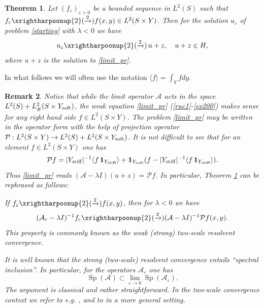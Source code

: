 \documentclass[11pt]{article}
\newcommand\e {\varepsilon}
\newcommand\stiff{{\rm stiff}}
\newcommand\soft{{\rm soft}}
\def\AA{\mathcal{A}}
\def\l{\lambda}
\DeclareMathOperator{\Sp}{Sp}
\newtheorem{theorem}{Theorem}[section]
\newtheorem{remark}[theorem]{Remark}
\theoremstyle{remark}
\begin{document}
\begin{theorem} \label{thmandrei1}
	Let $(f_\e )_{\e>0}$ be a bounded sequence in $L^2(S)$ such that $f_\e  \xrightharpoonup{2} (\xrightarrow{2})f(x,y)\in L^2(S\times Y)$.  Then for the solution $u_\e $ of problem \eqref{starting} with $\lambda<0$ we have
	$$ u_\e  \xrightharpoonup{2} (\xrightarrow{2})\,u+z , \quad u + z \in H,   $$
	where $u+z$ is the solution to \eqref{limit_pr}.
	
\end{theorem} 	

In what follows we will often use the notation $\langle f \rangle = \int_Y f dy$.


\begin{remark} \label{remandrei3}
	Notice that while the limit operator $\AA$  acts in the space $L^2(S)+L^2_\#(S\times Y_\soft)$, the weak equation \eqref{limit_pr} (\eqref{ruc1}-\eqref{ex200}) makes sense for any right hand side $f\in L^2(S\times Y)$. The problem \eqref{limit_pr} may be written in the operator form with the help of projection operator  $\mathcal{P}:L^2(S\times Y)\to L^2(S)+L^2(S\times Y_\soft)$. It is not difficult to see that for an element $f\in L^2(S\times Y)$ one has
	\begin{equation*}
		\mathcal{P}f = |Y_\stiff|^{-1} \langle f \,\mathbf{1}_{Y_\stiff}\rangle + \mathbf{1}_{Y_\soft} (f - |Y_\stiff|^{-1} \langle f\, \mathbf{1}_{Y_\stiff}\rangle).
	\end{equation*}
	Thus \eqref{limit_pr}  reads $(\AA - \l I)(u+z) = \mathcal{P} f$.
	In particular,   Theorem \ref{thmandrei1} can be rephrased as follows:
	
	\noindent If $f_\e  \xrightharpoonup{2} (\xrightarrow{2}) f(x,y)$, then for $\lambda<0$ we have
	$$ (\AA_\e-\lambda I)^{-1} f_\e  \xrightharpoonup{2} (\xrightarrow{2})(\AA-\lambda I)^{-1} \mathcal{P}f(x,y). $$
	This property is commonly known as the weak (strong) two-scale resolvent convergence.
	
	It is well known that the 	strong (two-scale) resolvent convergence entails ``spectral inclusion''. In particular, for the operators $\AA_\e$ one has
	\begin{equation}\label{14a}
		\Sp (\AA) \subset \lim_{\e \to 0} \Sp (\AA_\e ).
	\end{equation}
	The argument is classical and rather straightforward. In the two-scale convergence context we refer to e.g. \cite{zhikov2}, and to \cite{Past} in a more general setting.
	

\end{remark} 	
\end{document}
